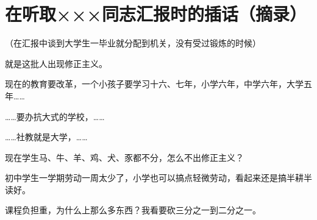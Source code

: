 \section[在听取×××同志汇报时的插话（摘录）（一九六五年十一月）]{在听取×××同志汇报时的插话（摘录）}


（在汇报中谈到大学生一毕业就分配到机关，没有受过锻炼的时候）

就是这批人出现修正主义。

现在的教育要改革，一个小孩子要学习十六、七年，小学六年，中学六年，大学五年……

……要办抗大式的学校，……

……社教就是大学，……

现在学生马、牛、羊、鸡、犬、豕都不分，怎么不出修正主义？

初中学生一学期劳动一周太少了，小学也可以搞点轻微劳动，看起来还是搞半耕半读好。

课程负担重，为什么上那么多东西？我看要砍三分之一到二分之一。


